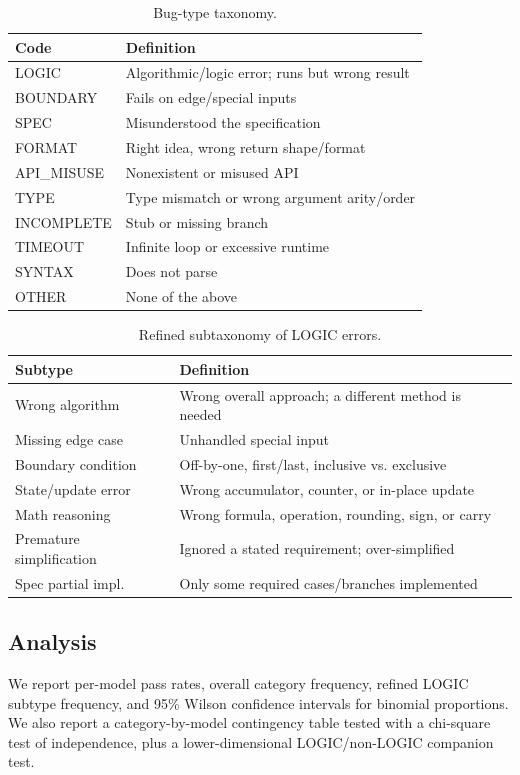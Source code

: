 \documentclass[10pt,journal]{article}
\begin{document}
\begin{table}[t]
\centering
\caption{Bug-type taxonomy.}
\label{tab:taxonomy}
\small
\begin{tabular}{ll}
\toprule
Code & Definition \\
\midrule
LOGIC & Algorithmic/logic error; runs but wrong result \\
BOUNDARY & Fails on edge/special inputs \\
SPEC & Misunderstood the specification \\
FORMAT & Right idea, wrong return shape/format \\
API\_MISUSE & Nonexistent or misused API \\
TYPE & Type mismatch or wrong argument arity/order \\
INCOMPLETE & Stub or missing branch \\
TIMEOUT & Infinite loop or excessive runtime \\
SYNTAX & Does not parse \\
OTHER & None of the above \\
\bottomrule
\end{tabular}
\end{table}

\begin{table}[t]
\centering
\caption{Refined subtaxonomy of LOGIC errors.}
\label{tab:subtaxonomy}
\small
\begin{tabular}{ll}
\toprule
Subtype & Definition \\
\midrule
Wrong algorithm & Wrong overall approach; a different method is needed \\
Missing edge case & Unhandled special input \\
Boundary condition & Off-by-one, first/last, inclusive vs. exclusive \\
State/update error & Wrong accumulator, counter, or in-place update \\
Math reasoning & Wrong formula, operation, rounding, sign, or carry \\
Premature simplification & Ignored a stated requirement; over-simplified \\
Spec partial impl. & Only some required cases/branches implemented \\
\bottomrule
\end{tabular}
\end{table}

\subsection{Analysis}
We report per-model pass rates, overall category frequency, refined LOGIC subtype
frequency, and 95\% Wilson confidence intervals for binomial proportions. We also
report a category-by-model contingency table tested with a chi-square test of
independence, plus a lower-dimensional LOGIC/non-LOGIC companion test.
\end{document}
